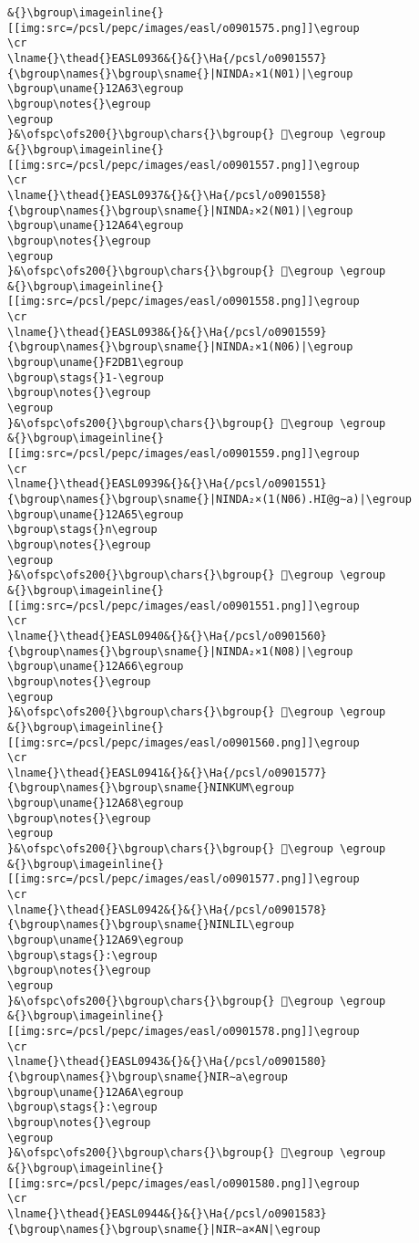 \begin{verbatim}
&{}\bgroup\imageinline{}[[img:src=/pcsl/pepc/images/easl/o0901575.png]]\egroup
\cr
\lname{}\thead{}EASL0936&{}&{}\Ha{/pcsl/o0901557}{\bgroup\names{}\bgroup\sname{}|NINDA₂×1(N01)|\egroup
\bgroup\uname{}12A63\egroup
\bgroup\notes{}\egroup
\egroup
}&\ofspc\ofs200{}\bgroup\chars{}\bgroup{} 𒩣\egroup \egroup
&{}\bgroup\imageinline{}[[img:src=/pcsl/pepc/images/easl/o0901557.png]]\egroup
\cr
\lname{}\thead{}EASL0937&{}&{}\Ha{/pcsl/o0901558}{\bgroup\names{}\bgroup\sname{}|NINDA₂×2(N01)|\egroup
\bgroup\uname{}12A64\egroup
\bgroup\notes{}\egroup
\egroup
}&\ofspc\ofs200{}\bgroup\chars{}\bgroup{} 𒩤\egroup \egroup
&{}\bgroup\imageinline{}[[img:src=/pcsl/pepc/images/easl/o0901558.png]]\egroup
\cr
\lname{}\thead{}EASL0938&{}&{}\Ha{/pcsl/o0901559}{\bgroup\names{}\bgroup\sname{}|NINDA₂×1(N06)|\egroup
\bgroup\uname{}F2DB1\egroup
\bgroup\stags{}1-\egroup
\bgroup\notes{}\egroup
\egroup
}&\ofspc\ofs200{}\bgroup\chars{}\bgroup{} 󲶱\egroup \egroup
&{}\bgroup\imageinline{}[[img:src=/pcsl/pepc/images/easl/o0901559.png]]\egroup
\cr
\lname{}\thead{}EASL0939&{}&{}\Ha{/pcsl/o0901551}{\bgroup\names{}\bgroup\sname{}|NINDA₂×(1(N06).HI@g∼a)|\egroup
\bgroup\uname{}12A65\egroup
\bgroup\stags{}n\egroup
\bgroup\notes{}\egroup
\egroup
}&\ofspc\ofs200{}\bgroup\chars{}\bgroup{} 𒩥\egroup \egroup
&{}\bgroup\imageinline{}[[img:src=/pcsl/pepc/images/easl/o0901551.png]]\egroup
\cr
\lname{}\thead{}EASL0940&{}&{}\Ha{/pcsl/o0901560}{\bgroup\names{}\bgroup\sname{}|NINDA₂×1(N08)|\egroup
\bgroup\uname{}12A66\egroup
\bgroup\notes{}\egroup
\egroup
}&\ofspc\ofs200{}\bgroup\chars{}\bgroup{} 𒩦\egroup \egroup
&{}\bgroup\imageinline{}[[img:src=/pcsl/pepc/images/easl/o0901560.png]]\egroup
\cr
\lname{}\thead{}EASL0941&{}&{}\Ha{/pcsl/o0901577}{\bgroup\names{}\bgroup\sname{}NINKUM\egroup
\bgroup\uname{}12A68\egroup
\bgroup\notes{}\egroup
\egroup
}&\ofspc\ofs200{}\bgroup\chars{}\bgroup{} 𒩨\egroup \egroup
&{}\bgroup\imageinline{}[[img:src=/pcsl/pepc/images/easl/o0901577.png]]\egroup
\cr
\lname{}\thead{}EASL0942&{}&{}\Ha{/pcsl/o0901578}{\bgroup\names{}\bgroup\sname{}NINLIL\egroup
\bgroup\uname{}12A69\egroup
\bgroup\stags{}:\egroup
\bgroup\notes{}\egroup
\egroup
}&\ofspc\ofs200{}\bgroup\chars{}\bgroup{} 𒩩\egroup \egroup
&{}\bgroup\imageinline{}[[img:src=/pcsl/pepc/images/easl/o0901578.png]]\egroup
\cr
\lname{}\thead{}EASL0943&{}&{}\Ha{/pcsl/o0901580}{\bgroup\names{}\bgroup\sname{}NIR∼a\egroup
\bgroup\uname{}12A6A\egroup
\bgroup\stags{}:\egroup
\bgroup\notes{}\egroup
\egroup
}&\ofspc\ofs200{}\bgroup\chars{}\bgroup{} 𒩪\egroup \egroup
&{}\bgroup\imageinline{}[[img:src=/pcsl/pepc/images/easl/o0901580.png]]\egroup
\cr
\lname{}\thead{}EASL0944&{}&{}\Ha{/pcsl/o0901583}{\bgroup\names{}\bgroup\sname{}|NIR∼a×AN|\egroup

\end{verbatim}
